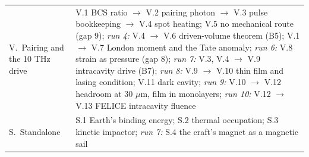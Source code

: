 \documentclass[10pt,a4paper]{article}
\theoremstyle{plain}
\theoremstyle{definition}
\begin{document}
\begin{tabularx}{\textwidth}{@{}lX@{}}
V.\ Pairing and the 10 THz drive & V.1 BCS ratio $\to$ V.2 pairing photon $\to$ V.3 pulse bookkeeping $\to$ V.4 spot heating; V.5 no mechanical route (gap 9);
\emph{run 4:} V.4 $\to$ V.6 driven-volume theorem (B5); V.1 $\to$ V.7 London moment and the Tate anomaly; \emph{run 6:} V.8 strain as
pressure (gap 8); \emph{run 7:} V.3, V.4 $\to$ V.9 intracavity drive (B7); \emph{run 8:} V.9 $\to$ V.10 thin film and lasing condition; V.11 dark cavity; \emph{run 9:} V.10 $\to$ V.12 headroom at 30 $\mu$m, film in monolayers; \emph{run 10:} V.12 $\to$ V.13 FELICE intracavity fluence\\
S.\ Standalone & S.1 Earth's binding energy; S.2 thermal occupation; S.3 kinetic impactor; \emph{run 7:} S.4 the craft's magnet as a magnetic sail\\
\bottomrule
\end{tabularx}
\end{document}
